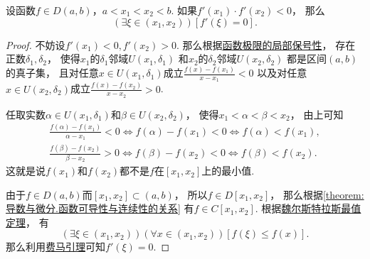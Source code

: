 \begin{theorem}[达布零点定理]\label{theorem:微分中值定理.达布定理1}
设函数\(f \in D(a,b)\)，\(a<x_1<x_2<b\).
如果\(f'(x_1) \cdot f'(x_2) < 0\)，
那么\begin{equation*}
	(\exists\xi\in(x_1,x_2))
	[f'(\xi) = 0].
\end{equation*}
\begin{proof}
不妨设\(f'(x_1)<0,f'(x_2)>0\).
那么根据\hyperref[theorem:极限.函数极限的局部保号性1]{函数极限的局部保号性}，
存在正数\(\delta_1,\delta_2\)，
使得\(x_1\)的\(\delta_1\)邻域\(U(x_1,\delta_1)\)
和\(x_2\)的\(\delta_2\)邻域\(U(x_2,\delta_2)\)
都是区间\((a,b)\)的真子集，
且对任意\(x \in U(x_1,\delta_1)\)成立\(\frac{f(x)-f(x_1)}{x-x_1}<0\)
以及对任意\(x \in U(x_2,\delta_2)\)成立\(\frac{f(x)-f(x_2)}{x-x_2}>0\).

任取实数\(\alpha \in U(x_1,\delta_1)\)和\(\beta \in U(x_2,\delta_2)\)，
使得\(x_1<\alpha<\beta<x_2\)，
由上可知\begin{equation*}
	\begin{split}
		\frac{f(\alpha)-f(x_1)}{\alpha-x_1}<0
		\iff
		f(\alpha)-f(x_1)<0
		\iff
		f(\alpha)<f(x_1), \\
		\frac{f(\beta)-f(x_2)}{\beta-x_2}>0
		\iff
		f(\beta)-f(x_2)<0
		\iff
		f(\beta)<f(x_2).
	\end{split}
\end{equation*}
这就是说\(f(x_1)\)和\(f(x_2)\)都不是\(f\)在\([x_1,x_2]\)上的最小值.

由于\(f \in D(a,b)\)而\([x_1,x_2]\subset(a,b)\)，
所以\(f \in D[x_1,x_2]\)，
那么根据\cref{theorem:导数与微分.函数可导性与连续性的关系}
有\(f \in C[x_1,x_2]\).
根据\hyperref[theorem:极限.最值定理]{魏尔斯特拉斯最值定理}，
有\begin{equation*}
	(\exists\xi\in(x_1,x_2))
	(\forall x\in(x_1,x_2))
	[f(\xi) \leq f(x)].
\end{equation*}
那么利用\hyperref[theorem:微分中值定理.费马引理]{费马引理}可知\(f'(\xi)=0\).
\end{proof}
\end{theorem}

